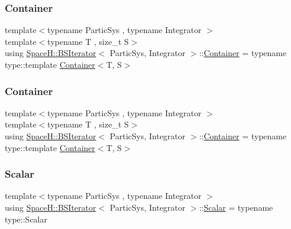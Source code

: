 \subsubsection{\texorpdfstring{Container}{Container}\hspace{0.1cm}{\footnotesize\ttfamily [1/2]}}
{\footnotesize\ttfamily template$<$typename Partic\+Sys , typename Integrator $>$ \\
template$<$typename T , size\+\_\+t S$>$ \\
using \mbox{\hyperlink{class_space_h_1_1_b_s_iterator}{Space\+H\+::\+B\+S\+Iterator}}$<$ Partic\+Sys, Integrator $>$\+::\mbox{\hyperlink{class_space_h_1_1_b_s_iterator_a6f704f5db07202710306e6e334c99e2f}{Container}} =  typename type\+::template \mbox{\hyperlink{class_space_h_1_1_b_s_iterator_a6f704f5db07202710306e6e334c99e2f}{Container}}$<$T, S$>$}

\mbox{\label{class_space_h_1_1_b_s_iterator_a6f704f5db07202710306e6e334c99e2f}} 
\subsubsection{\texorpdfstring{Container}{Container}\hspace{0.1cm}{\footnotesize\ttfamily [2/2]}}
{\footnotesize\ttfamily template$<$typename Partic\+Sys , typename Integrator $>$ \\
template$<$typename T , size\+\_\+t S$>$ \\
using \mbox{\hyperlink{class_space_h_1_1_b_s_iterator}{Space\+H\+::\+B\+S\+Iterator}}$<$ Partic\+Sys, Integrator $>$\+::\mbox{\hyperlink{class_space_h_1_1_b_s_iterator_a6f704f5db07202710306e6e334c99e2f}{Container}} =  typename type\+::template \mbox{\hyperlink{class_space_h_1_1_b_s_iterator_a6f704f5db07202710306e6e334c99e2f}{Container}}$<$T, S$>$}

\mbox{\label{class_space_h_1_1_b_s_iterator_a89993409583b3022709bdfd84ea8149d}} 
\subsubsection{\texorpdfstring{Scalar}{Scalar}\hspace{0.1cm}{\footnotesize\ttfamily [1/2]}}
{\footnotesize\ttfamily template$<$typename Partic\+Sys , typename Integrator $>$ \\
using \mbox{\hyperlink{class_space_h_1_1_b_s_iterator}{Space\+H\+::\+B\+S\+Iterator}}$<$ Partic\+Sys, Integrator $>$\+::\mbox{\hyperlink{class_space_h_1_1_b_s_iterator_a89993409583b3022709bdfd84ea8149d}{Scalar}} =  typename type\+::\+Scalar}

